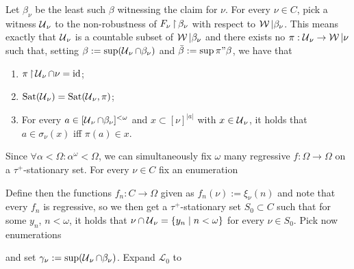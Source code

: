 {


Let $\beta_\nu$ be the least such $\beta$ witnessing the claim for $\nu$. For every $\nu\in C$, pick a witness $\operatorname{\mathcal{U}}_\nu$ to the non-robustness of $F_\nu\operatorname{\upharpoonright}\beta_\nu$ with respect to $\operatorname{\mathcal{W}}|\beta_\nu$. This means exactly that $\operatorname{\mathcal{U}}_\nu$ is a countable subset of $\operatorname{\mathcal{W}}|\beta_\nu$ and there exists no $\pi:\operatorname{\mathcal{U}}_\nu\to\operatorname{\mathcal{W}}|\nu$ such that, setting $\beta:=\sup(\operatorname{\mathcal{U}}_\nu\cap\beta_\nu)$ and $\bar\beta:=\sup\pi"\beta$, we have that
\begin{enumerate}
  \item $\pi\operatorname{\upharpoonright}\operatorname{\mathcal{U}}_\nu\cap\nu=\operatorname{id}$;
  \item $\operatorname{Sat}(\operatorname{\mathcal{U}}_\nu)=\operatorname{Sat}(\operatorname{\mathcal{U}}_\nu,\pi)$;
  \item For every $a\in[\operatorname{\mathcal{U}}_\nu\cap\beta_\nu]^{<\omega}$ and $x\subset[\nu]^{|a|}$ with $x\in\operatorname{\mathcal{U}}_\nu$, it holds that $a\in\sigma_\nu(x)$ iff $\pi(a)\in x$.\\
\end{enumerate}

Since $\forall\alpha<\Omega:\alpha^\omega<\Omega$, we can simultaneously fix $\omega$ many regressive $f:\Omega\to\Omega$ on a $\tau^+$-stationary set. For every $\nu\in C$ fix an enumeration

Define then the functions $f_n:C\to\Omega$ given as $f_n(\nu):=\xi_\nu(n)$ and note that every $f_n$ is regressive, so we then get a $\tau^+$-stationary set $S_0\subset C$ such that for some $y_n$, $n<\omega$, it holds that $\nu\cap\operatorname{\mathcal{U}}_\nu=\{y_n\mid n<\omega\}$ for every $\nu\in S_0$. Pick now enumerations

and set $\gamma_\nu:=\sup(\operatorname{\mathcal{U}}_\nu\cap\beta_\nu)$. Expand $\mathcal L_0$ to

}
